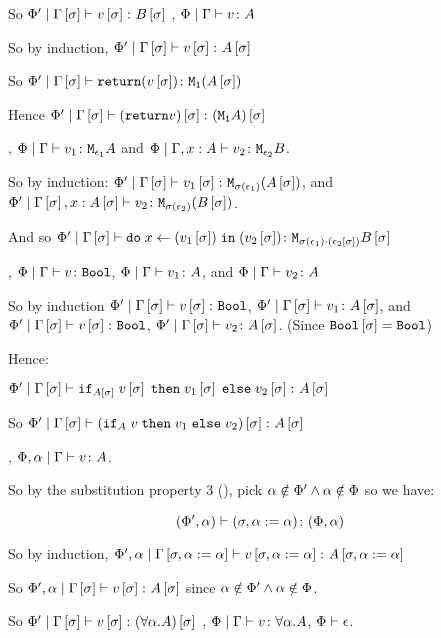 {    So $\etyperelation{\P'}{\G\ssi}{v\ssi}{B\ssi}$
    \bi, $\gpetyperelation{v}{A}$

    So by induction, $\etyperelation{\P'}{\G\ssi}{v\ssi}{A\ssi}$

    So $\etyperelation{\P'}{\G\ssi}{\return{(v\ssi)}}{\M{\1}{(A\ssi)}}$

    Hence $\etyperelation{\P'}{\G\ssi}{(\return{v})\ssi}{(\moa)\ssi}$

    \bi, $\gpetyperelation{v_1}{\M{\e_1}{A}}$ and $\etyperelation{\P}{\gax}{v_2}{\M{\e_2}{B}}$.

    So by induction: $\etyperelation{\P'}{\G\ssi}{v_1\ssi}{\M{\si(\e_1)}{(A\ssi)}}$, and $\etyperelation{\P'}{\G\ssi, x:A\ssi}{v_2}{\M{\si(\e_2)}{(B\ssi)}}$.

    And so $\etyperelation{\P'}{\G\ssi}{\doin{x}{(v_1\ssi)}{(v_2\ssi)}}{\M{\si(\e_1)\dot(\e_2\ssi)}{B\ssi}}$



    \bi, $\gpetyperelation{v}{\B}$, $\gpetyperelation{v_1}{A}$, and $\gpetyperelation{v_2}{A}$

    So by induction $\etyperelation{\P'}{\G\ssi}{v\ssi}{\B}$, $\etyperelation{\P'}{\G\ssi}{v_1}{A\ssi}$, and $\etyperelation{\P'}{\G\ssi}{v\ssi}{\B}$, $\etyperelation{\P'}{\G\ssi}{v_2}{A\ssi}$.
    (Since $\B\ssi = \B$)

    Hence:

    $\etyperelation{\P'}{\G\ssi}{\pifthenelse{A\ssi}{v\ssi}{v_1\ssi}{v_2\ssi}}{A\ssi}$

    So $\etyperelation{\P'}{\G\ssi}{(\pifthenelse{A}{v}{v_1}{v_2})\ssi}{A\ssi}$

    \bi, $\etyperelation{\P,\a}{\G}{v}{A}$.

    So by the substitution property 3 (), pick $\a\notin\P'\wedge\a\notin\P$ so we have:

    $$\typerelation{(\P',\a)}{(\si, \a\setto\a)}{(\P,\a)}$$

    So by induction, $\etyperelation{\P', \a}{\G\sub{\si, \a\setto\a}}{v\sub{\si,\a\setto\a}}{A\sub{\si, \a\setto\a}}$

    So $\etyperelation{\P',\a}{\G\ssi}{v\ssi}{A\ssi}$ since $\a\notin\P' \wedge\a\notin\P$.

    So $\etyperelation{\P'}{\G\ssi}{v\ssi}{(\all{\a}{A})\ssi}$
    \bi, $\gpetyperelation{v}{\all{\a}{A}}$, $\wellformed{\P}{\e}$.

}
